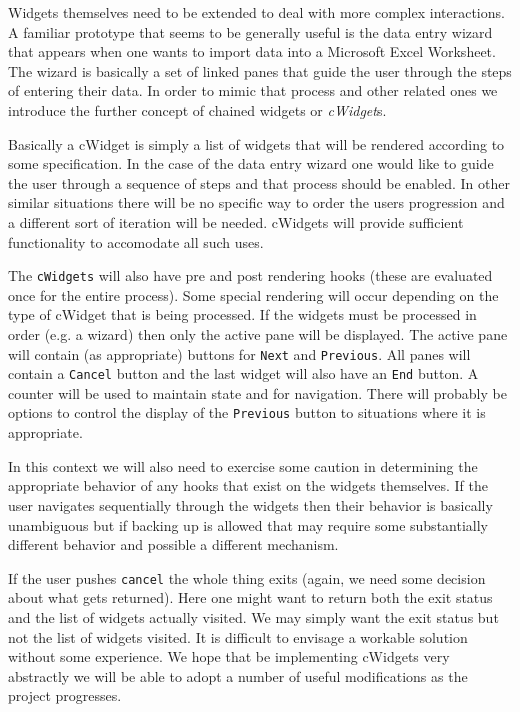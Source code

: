 \documentclass{article}
\begin{document}
Widgets themselves need to be extended to deal with more complex
interactions. A familiar prototype that seems to be generally useful
is the data entry wizard that appears when one wants to import data
into a Microsoft Excel Worksheet. The wizard is basically a set of
linked panes that guide the user through the steps of entering their
data. In order to mimic that process and other related ones we
introduce the further concept of chained widgets or {\em cWidget}s.

Basically a cWidget is simply a list of widgets that will
be rendered according to some specification. 
In the case of the data entry wizard one would like to guide the user
through a sequence of steps and that process should be enabled. In
other similar situations there will be no specific way to order the
users progression and a different sort of iteration will be needed. 
cWidgets will provide sufficient functionality to accomodate all such
uses.

The \verb+cWidgets+ will also have pre and
post rendering hooks (these are evaluated once for the entire
process). 
Some special rendering will occur depending on the type of cWidget
that is being processed. If the widgets must be processed in order
(e.g. a wizard) then only the active pane will be displayed. The
active pane will contain (as appropriate) buttons for \verb+Next+ 
and \verb+Previous+. All panes will contain a \verb+Cancel+ button and
the last widget will also have an \verb+End+ button. A counter
will be used to maintain state and for navigation. 
There will probably be options to control the display of the
\verb+Previous+ button to situations where it is appropriate. 

In this context we will also need to exercise some caution in
determining the appropriate behavior of any hooks that exist on the
widgets themselves. If the user navigates sequentially through the
widgets then their behavior is basically unambiguous but if backing up
is allowed that may require some substantially different behavior and
possible a different mechanism.

If the user pushes \verb+cancel+ the whole thing exits (again, we need
some decision about what gets returned). Here one might want to return
both the exit status and the list of widgets actually visited.
We may simply want the exit status but not the list of
widgets visited.
It is difficult to envisage a workable solution without some
experience. We hope that be implementing cWidgets very abstractly we
will be able to adopt a number of useful modifications as the project
progresses.
\end{document}
